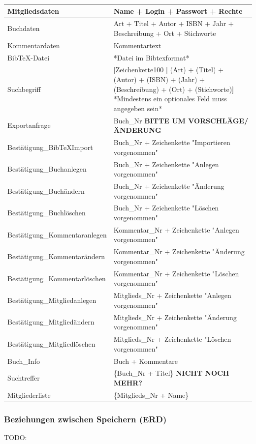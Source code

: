\begin{longtable}{|l|p{8.5cm}|}
Mitgliedsdaten & Name + Login + Passwort + Rechte \\
\hline
Buchdaten & Art + Titel + Autor + ISBN + Jahr + Beschreibung + Ort + Stichworte \\
\hline
Kommentardaten & Kommentartext \\
\hline
BibTeX-Datei & *Datei im Bibtexformat* \\
\hline
Suchbegriff & [Zeichenkette100 | (Art) + (Titel) + (Autor) + (ISBN) + (Jahr) + (Beschreibung) + (Ort) + (Stichworte)] *Mindestens ein optionales Feld muss angegeben sein* \\
\hline
Exportanfrage & Buch\_Nr \textbf{BITTE UM VORSCHLÄGE/ÄNDERUNG} \\
\hline\hline

Bestätigung\_BibTeXImport & Buch\_Nr + Zeichenkette "Importieren vorgenommen" \\
\hline
Bestätigung\_Buchanlegen & Buch\_Nr + Zeichenkette "Anlegen vorgenommen" \\
\hline
Bestätigung\_Buchändern & Buch\_Nr + Zeichenkette "Änderung vorgenommen" \\
\hline
Bestätigung\_Buchlöschen & Buch\_Nr + Zeichenkette "Löschen vorgenommen" \\
\hline
Bestätigung\_Kommentaranlegen & Kommentar\_Nr + Zeichenkette "Anlegen vorgenommen" \\
\hline
Bestätigung\_Kommentarändern & Kommentar\_Nr + Zeichenkette "Änderung vorgenommen" \\
\hline
Bestätigung\_Kommentarlöschen & Kommentar\_Nr + Zeichenkette "Löschen vorgenommen" \\
\hline
Bestätigung\_Mitgliedanlegen & Mitglieds\_Nr + Zeichenkette "Anlegen vorgenommen" \\
\hline
Bestätigung\_Mitgliedändern & Mitglieds\_Nr + Zeichenkette "Änderung vorgenommen" \\
\hline
Bestätigung\_Mitgliedlöschen & Mitglieds\_Nr + Zeichenkette "Löschen vorgenommen" \\
\hline
Buch\_Info & Buch + Kommentare \\
\hline
Suchtreffer & \{Buch\_Nr + Titel\} \textbf{NICHT NOCH MEHR?}\\
\hline
Mitgliederliste & \{Mitglieds\_Nr + Name\}\\
\hline
\end{longtable}

\subsubsection{Beziehungen zwischen Speichern (ERD)}
TODO:

